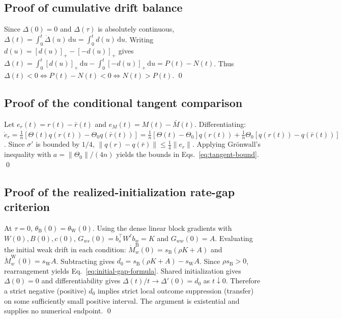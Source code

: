 \documentclass{article}
\theoremstyle{definition}
\theoremstyle{remark}
\newcommand{\sigm}{\sigma}
\newcommand{\Bcond}{\mathrm{B}}
\newcommand{\Wcond}{\mathrm{W}}
\newcommand{\dd}{\,\mathrm{d}}
\begin{document}
\subsection{Proof of cumulative drift balance}
\label{app:proof-prop-drift}
Since $\Delta(0) = 0$ and $\Delta(\tau)$ is absolutely continuous, $\Delta(t) = \int_0^t \dot{\Delta}(u) \dd u = \int_0^t d(u) \dd u$.
Writing $d(u) = [d(u)]_+ - [-d(u)]_+$ gives $\Delta(t) = \int_0^t [d(u)]_+ \dd u - \int_0^t [-d(u)]_+ \dd u = P(t) - N(t)$.
Thus $\Delta(t) < 0 \iff P(t) - N(t) < 0 \iff N(t) > P(t)$. \qed

\subsection{Proof of the conditional tangent comparison}
\label{app:proof-thm-tangent}
Let $e_r(t) = r(t) - \bar r(t)$ and $e_M(t) = M(t) - \bar M(t)$. Differentiating:
$\dot e_r = \frac1n [\Theta(t) q(r(t)) - \Theta_0 q(\bar r(t))] = \frac1n [\Theta(t) - \Theta_0] q(r(t)) + \frac1n \Theta_0 [q(r(t)) - q(\bar r(t))]$.
Since $\sigm'$ is bounded by $1/4$, $\|q(r) - q(\bar r)\| \le \frac14 \|e_r\|$.
Applying Grönwall's inequality with $a = \|\Theta_0\| / (4n)$ yields the bounds in Eqs.~\eqref{eq:tangent-bound}. \qed

\subsection{Proof of the realized-initialization rate-gap criterion}
\label{app:proof-thm-initial}
At $\tau=0$, $\theta_{\Bcond}(0) = \theta_{\Wcond}(0)$. Using the dense linear block gradients with $W(0), B(0), c(0)$, $G_{ws}(0) = b_s^\top W^\ell b_w = K$ and $G_{ww}(0) = A$.
Evaluating the initial weak drift in each condition:
$\dot M_w^{\Bcond}(0) = s_{\Bcond}(\rho K + A)$ and $\dot M_w^{\Wcond}(0) = s_{\Wcond} A$.
Subtracting gives $d_0 = s_{\Bcond}(\rho K + A) - s_{\Wcond} A$. Since $\rho s_{\Bcond}>0$, rearrangement yields Eq.~\eqref{eq:initial-gap-formula}. Shared initialization gives $\Delta(0)=0$ and differentiability gives $\Delta(t)/t\to\Delta'(0)=d_0$ as $t\downarrow0$. Therefore a strict negative (positive) $d_0$ implies strict local outcome suppression (transfer) on some sufficiently small positive interval. The argument is existential and supplies no numerical endpoint. \qed
\end{document}
